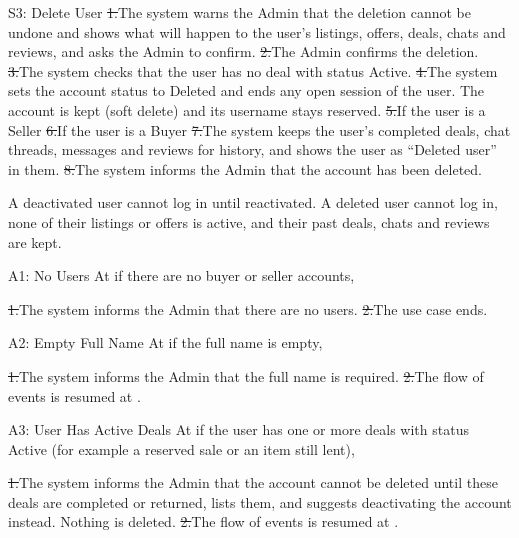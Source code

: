 \begin{flowblock}{S3: Delete User}
\st{1.}{The system warns the Admin that the deletion cannot be undone and shows what will happen to the user's listings, offers, deals, chats and reviews, and asks the Admin to confirm.}
\st{2.}{The Admin confirms the deletion.}
\st{3.}{The system checks that the user has no deal with status Active.}
\st{4.}{The system sets the account status to Deleted and ends any open session of the user. The account is kept (soft delete) and its username stays reserved.}
\st{5.}{If the user is a Seller}
\st{6.}{If the user is a Buyer}
\st{7.}{The system keeps the user's completed deals, chat threads, messages and reviews for history, and shows the user as ``Deleted user'' in them.}
\st{8.}{The system informs the Admin that the account has been deleted.}
\end{flowblock}
A deactivated user cannot log in until reactivated. A deleted user cannot log in, none of their listings or offers is active, and their past deals, chats and reviews are kept.\par
{}
\begin{flowblock}{A1: No Users}
At  if there are no buyer or seller accounts,\par
\st{1.}{The system informs the Admin that there are no users.}
\st{2.}{The use case ends.}
\end{flowblock}
\begin{flowblock}{A2: Empty Full Name}
At  if the full name is empty,\par
\st{1.}{The system informs the Admin that the full name is required.}
\st{2.}{The flow of events is resumed at .}
\end{flowblock}
\begin{flowblock}{A3: User Has Active Deals}
At  if the user has one or more deals with status Active (for example a reserved sale or an item still lent),\par
\st{1.}{The system informs the Admin that the account cannot be deleted until these deals are completed or returned, lists them, and suggests deactivating the account instead. Nothing is deleted.}
\st{2.}{The flow of events is resumed at .}
\end{flowblock}
